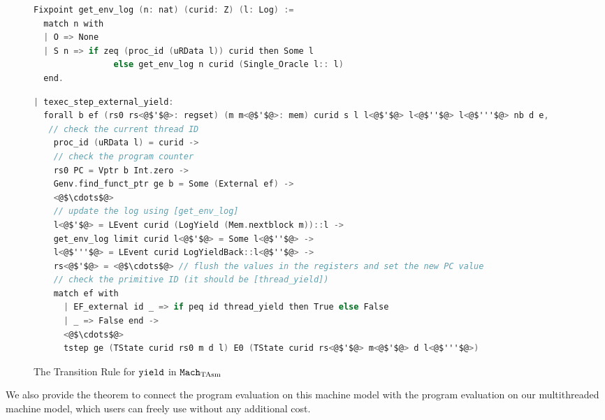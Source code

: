 \begin{figure}
\begin{lstlisting}[language=C]
Fixpoint get_env_log (n: nat) (curid: Z) (l: Log) :=
  match n with
  | O => None
  | S n => if zeq (proc_id (uRData l)) curid then Some l
                else get_env_log n curid (Single_Oracle l:: l)
  end.
\end{lstlisting}

\begin{lstlisting}[language=C]
| texec_step_external_yield:
  forall b ef (rs0 rs<@$'$@>: regset) (m m<@$'$@>: mem) curid s l l<@$'$@> l<@$''$@> l<@$'''$@> nb d e,
   // check the current thread ID
    proc_id (uRData l) = curid ->
    // check the program counter
    rs0 PC = Vptr b Int.zero ->
    Genv.find_funct_ptr ge b = Some (External ef) ->
    <@$\cdots$@>
    // update the log using [get_env_log]
    l<@$'$@> = LEvent curid (LogYield (Mem.nextblock m))::l ->
    get_env_log limit curid l<@$'$@> = Some l<@$''$@> ->
    l<@$'''$@> = LEvent curid LogYieldBack::l<@$''$@> ->
    rs<@$'$@> = <@$\cdots$@> // flush the values in the registers and set the new PC value
    // check the primitive ID (it should be [thread_yield])
    match ef with 
      | EF_external id _ => if peq id thread_yield then True else False
      | _ => False end ->
	  <@$\cdots$@>
      tstep ge (TState curid rs0 m d l) E0 (TState curid rs<@$'$@> m<@$'$@> d l<@$'''$@>)
\end{lstlisting}
\caption{The Transition Rule for ${\mathrm{\texttt{yield}}}$ in ${\mathrm{\texttt{Mach}}}_{\mathrm{TAsm}}$}
\label{fig:chapter:conlink:yield-rule-in-tasm}
\end{figure}

We also provide 
the theorem to connect the program evaluation on this machine model  
with the program evaluation on our multithreaded machine model,
which users can freely use without any additional cost.

\begin{lemma}

\end{lemma}

%

